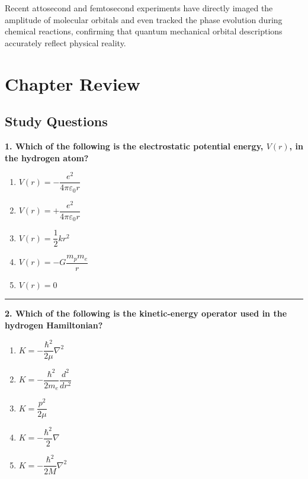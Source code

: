 \documentclass[
  english,
  9pt,
]{extbook}
\providecommand{\tightlist}{%
  \setlength{\itemsep}{0pt}\setlength{\parskip}{0pt}}
\theoremstyle{definition}
\theoremstyle{definition}
\theoremstyle{definition}
\theoremstyle{definition}
\theoremstyle{remark}
\begin{document}
Recent attosecond and femtosecond experiments have directly imaged the amplitude of molecular orbitals and even tracked the phase evolution during chemical reactions, confirming that quantum mechanical orbital descriptions accurately reflect physical reality.

\section{Chapter Review}\label{rev5}

\subsection{Study Questions}\label{quest5}

\textbf{1. Which of the following is the electrostatic potential energy, \(V(r)\), in the hydrogen atom?}

\begin{enumerate}
\def\labelenumi{\alph{enumi}.}
\tightlist
\item
  \(V(r) = -\dfrac{e^2}{4\pi \varepsilon_0 r}\)\\
\item
  \(V(r) = +\dfrac{e^2}{4\pi \varepsilon_0 r}\)\\
\item
  \(V(r) = \dfrac{1}{2} k r^2\)\\
\item
  \(V(r) = -G \dfrac{m_p m_e}{r}\)\\
\item
  \(V(r) = 0\)
\end{enumerate}

\begin{center}\rule{0.5\linewidth}{0.5pt}\end{center}

\textbf{2. Which of the following is the kinetic-energy operator used in the hydrogen Hamiltonian?}

\begin{enumerate}
\def\labelenumi{\alph{enumi}.}
\tightlist
\item
  \(K = -\dfrac{\hbar^2}{2\mu}\nabla^2\)\\
\item
  \(K = -\dfrac{\hbar^2}{2m_e}\dfrac{d^2}{dr^2}\)\\
\item
  \(K = \dfrac{p^2}{2\mu}\)\\
\item
  \(K = -\dfrac{\hbar^2}{2}\nabla\)\\
\item
  \(K = -\dfrac{\hbar^2}{2M}\nabla^2\)
\end{enumerate}
\end{document}
